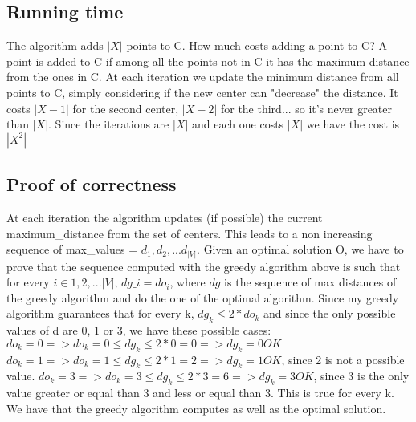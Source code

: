 \documentclass[12pt]{article}
\begin{document}
\subsection*{Running time}
The algorithm adds $|X|$ points to C. How much costs adding a point to C? A point is added to C if among all the points not in C it has the maximum distance from the ones in C. At each iteration we update the minimum distance from all points to C, simply considering if the new center can "decrease" the distance. It costs $|X - 1|$ for the second center, $|X - 2|$ for the third... so it's never greater than $|X|$. Since the iterations are $|X|$ and each one costs $|X|$ we have the cost is $|X^2|$
\subsection*{Proof of correctness}
At each iteration the algorithm updates (if possible) the current maximum\_distance from the set of centers. This leads to a non increasing sequence of max\_values = ${d_1, d_2, ... d_{|V|}}$. Given an optimal solution O, we have to prove that the sequence computed with the greedy algorithm above is such that for every $i \in {1, 2, ... |V|}$, $dg\_i = do_i $, where $dg$ is the sequence of max distances of the greedy algorithm and do the one of the optimal algorithm. Since my greedy algorithm guarantees that for every k, $dg_k \leq 2* do_k$ and since the only possible values of d are 0, 1 or 3, we have these possible cases:
$do_k = 0 =>  do_k = 0 \leq dg_k \leq 2* 0 = 0 => dg_k = 0 OK$
$do_k = 1 =>  do_k = 1 \leq dg_k \leq 2* 1 = 2 => dg_k = 1 OK$, since 2 is not a possible value.
$do_k = 3 =>  do_k = 3 \leq dg_k \leq 2* 3 = 6 => dg_k = 3 OK$, since 3 is the only value greater or equal than 3 and less or equal than 3.
This is true for every k. We have that the greedy algorithm computes as well as the optimal solution.

\section{}
\section{}
\section{}
\end{document}
